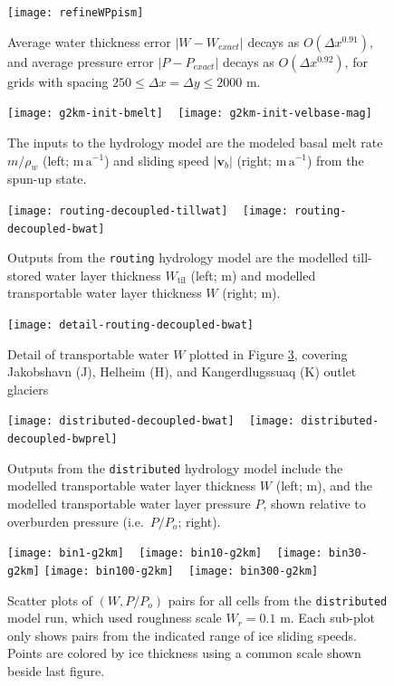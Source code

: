 \documentclass[gmd]{copernicus}   %
\begin{document}
\begin{figure}[ht]
\texttt{[image: refineWPpism]}
\caption{Average water thickness error $|W-W_{exact}|$ decays as $O(\Delta x^{0.91})$, and average pressure error $|P-P_{exact}|$ decays as $O(\Delta x^{0.92})$, for grids with spacing $250 \le \Delta x = \Delta y \le 2000$ m.}
\label{fig:refineWPpism}
\end{figure}

\begin{figure}[ht]
\mbox{\texttt{[image: g2km-init-bmelt]} \,
\texttt{[image: g2km-init-velbase-mag]}}
\caption{The inputs to the hydrology model are the modeled basal melt rate $m/\rho_w$ (left; $\mathrm{m}\,\mathrm{a}^{-1}$) and sliding speed $|\mathbf{v}_b|$ (right; $\mathrm{m}\,\mathrm{a}^{-1}$) from the spun-up state.}
\label{fig:Greenhydroinputs}
\end{figure}

\begin{figure}[ht]
\mbox{\texttt{[image: routing-decoupled-tillwat]} \,
\texttt{[image: routing-decoupled-bwat]}}
\caption{Outputs from the \texttt{routing} hydrology model are the modelled till-stored water layer thickness $W_{\text{til}}$ (left; $\mathrm{m}$) and modelled transportable water layer thickness $W$ (right; $\mathrm{m}$).}
\label{fig:Greenroutingresults}
\end{figure}

\begin{figure}[ht]
\texttt{[image: detail-routing-decoupled-bwat]}
\caption{Detail of transportable water $W$ plotted in Figure \ref{fig:Greenroutingresults}, covering Jakobshavn (J), Helheim (H), and Kangerdlugssuaq (K) outlet glaciers}
\label{fig:Greenroutingdetail}
\end{figure}

\begin{figure}[ht]
\mbox{\texttt{[image: distributed-decoupled-bwat]} \,
\texttt{[image: distributed-decoupled-bwprel]}}
\caption{Outputs from the \texttt{distributed} hydrology model include the modelled transportable water layer thickness $W$ (left; $\mathrm{m}$), and the modelled transportable water layer pressure $P$, shown relative to overburden pressure (i.e.~$P/P_o$; right).}
\label{fig:Greendistributedresults}
\end{figure}

\begin{figure}[ht]
\mbox{\texttt{[image: bin1-g2km]} \, \texttt{[image: bin10-g2km]} \, \texttt{[image: bin30-g2km]}}
\mbox{\texttt{[image: bin100-g2km]} \,
\texttt{[image: bin300-g2km]}}
\caption{Scatter plots of $(W,P/P_o)$ pairs for all cells from the \texttt{distributed} model run, which used roughness scale $W_r = 0.1$ m.  Each sub-plot only shows pairs from the indicated range of ice sliding speeds.  Points are colored by ice thickness using a common scale shown beside last figure.}
\label{fig:GreenisPofW}
\end{figure}
\end{document}
